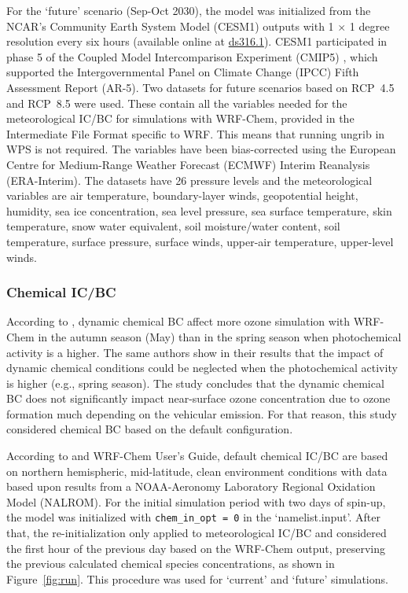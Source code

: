 		For the `future' scenario (Sep-Oct 2030), the model was initialized from the NCAR's Community Earth System Model (CESM1) outputs with 1 $\times$ 1 degree resolution every six hours (available online at \href{https://rda.ucar.edu/datasets/ds316.1/}{ds316.1}).
		CESM1 participated in phase 5 of the Coupled Model Intercomparison Experiment (CMIP5) \citep{Monaghan2014}, which supported the Intergovernmental Panel on Climate Change (IPCC) Fifth Assessment Report (AR-5).
		Two datasets for future scenarios based on RCP~4.5 and RCP~8.5 were used.
		These contain all the variables needed for the meteorological IC/BC for simulations with WRF-Chem, provided in the Intermediate File Format specific to WRF. This means that running ungrib in WPS is not required.
		The variables have been bias-corrected using the European Centre for Medium-Range Weather Forecast (ECMWF) Interim Reanalysis (ERA-Interim).
		The datasets have 26 pressure levels and the meteorological variables are air temperature, boundary-layer winds, geopotential height, humidity, sea ice concentration, sea level pressure, sea surface temperature, skin temperature, snow water equivalent, soil moisture/water content, soil temperature, surface pressure, surface winds, upper-air temperature, upper-level winds.
		
		\subsubsection{Chemical IC/BC}
		According to \citet{Gavidia2018}, dynamic chemical BC affect more ozone simulation with WRF-Chem in the autumn season (May) than in the spring season when photochemical activity is a higher. 
		The same authors show in their results that the impact of dynamic chemical conditions could be neglected when the photochemical activity is higher (e.g., spring season).
		The study concludes that the dynamic chemical BC does not significantly impact near-surface ozone concentration due to ozone formation much depending on the vehicular emission.
		For that reason, this study considered chemical BC based on the default configuration.
		
		According to \citet{Grell2005} and WRF-Chem User's Guide, default chemical IC/BC are based on northern hemispheric, mid-latitude, clean environment conditions with data based upon results from a NOAA-Aeronomy Laboratory Regional Oxidation Model (NALROM).
		For the initial simulation period with two days of spin-up, the model was initialized with \verb|chem_in_opt = 0| in the `namelist.input'.
		After that, the re-initialization only applied to meteorological IC/BC and considered the first hour of the previous day based on the WRF-Chem output, preserving the previous calculated chemical species concentrations, as shown in Figure~\ref{fig:run}.
		This procedure was used for `current' and `future' simulations.

